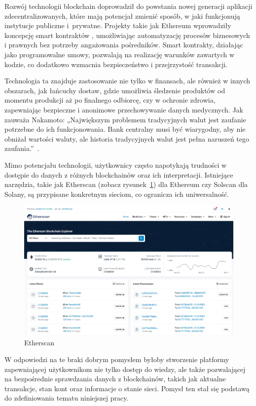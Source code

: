Rozwój technologii blockchain doprowadził do powstania nowej generacji aplikacji zdecentralizowanych, które mają potencjał zmienić sposób, w jaki funkcjonują instytucje publiczne i~prywatne. Projekty takie jak Ethereum  wprowadziły koncepcję smart kontraktów \cite{mastering_blockchain}, umożliwiając automatyzację procesów biznesowych i prawnych bez potrzeby angażowania pośredników. Smart kontrakty, działając jako programowalne umowy, pozwalają na realizację warunków zawartych w kodzie, co dodatkowo wzmacnia bezpieczeństwo i przejrzystość transakcji.

Technologia ta znajduje zastosowanie nie tylko w finansach, ale również w innych obszarach, jak łańcuchy dostaw, gdzie umożliwia śledzenie produktów od momentu produkcji aż po finalnego odbiorcę, czy w ochronie zdrowia, zapewniając bezpieczne i anonimowe przechowywanie danych medycznych. Jak zauważa Nakamoto: „Największym problemem tradycyjnych walut jest zaufanie potrzebne do ich funkcjonowania. Bank centralny musi być wiarygodny, aby nie obniżał wartości waluty, ale historia tradycyjnych walut jest pełna naruszeń tego zaufania.”~\cite{nakamoto_2008}.

Mimo potencjału technologii, użytkownicy często napotykają trudności w dostępie do danych z różnych blockchainów oraz ich interpretacji. Istniejące narzędzia, takie jak Etherscan (zobacz rysunek~\ref{fig:Etherscan}) dla Ethereum czy Solscan dla Solany, są przypisane konkretnym sieciom, co ogranicza ich uniwersalność. 
\begin{figure}[htb]
    \centering
    \includegraphics[width=0.9\linewidth]{./obrazy/Etherscan.png}
    \caption{Etherscan}
    \label{fig:Etherscan}
\end{figure}

W odpowiedzi na te braki dobrym pomysłem byłoby stworzenie platformy zapewniającej użytkownikom nie tylko dostęp do wiedzy, ale także pozwalającej na bezpośrednie sprawdzania danych z blockchainów, takich jak aktualne transakcje, stan kont oraz informacje o stanie sieci. Pomysł ten stał się podstawą do zdefiniowania tematu niniejszej pracy.


